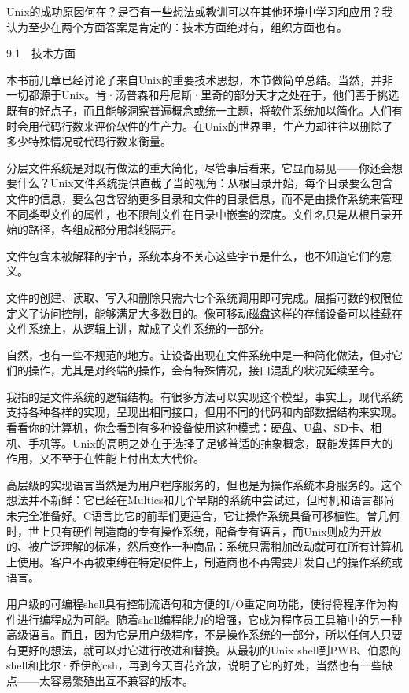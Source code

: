 \documentclass[a4paper,12pt,UTF8,twoside]{ctexbook}
\begin{document}
Unix的成功原因何在？是否有一些想法或教训可以在其他环境中学习和应用？我认为至少在两个方面答案是肯定的：技术方面绝对有，组织方面也有。





9.1　技术方面


本书前几章已经讨论了来自Unix的重要技术思想，本节做简单总结。当然，并非一切都源于Unix。肯·汤普森和丹尼斯·里奇的部分天才之处在于，他们善于挑选既有的好点子，而且能够洞察普遍概念或统一主题，将软件系统加以简化。人们有时会用代码行数来评价软件的生产力。在Unix的世界里，生产力却往往以删除了多少特殊情况或代码行数来衡量。

分层文件系统是对既有做法的重大简化，尽管事后看来，它显而易见——你还会想要什么？Unix文件系统提供直截了当的视角：从根目录开始，每个目录要么包含文件的信息，要么包含容纳更多目录和文件的目录信息，而不是由操作系统来管理不同类型文件的属性，也不限制文件在目录中嵌套的深度。文件名只是从根目录开始的路径，各组成部分用斜线隔开。

文件包含未被解释的字节，系统本身不关心这些字节是什么，也不知道它们的意义。

文件的创建、读取、写入和删除只需六七个系统调用即可完成。屈指可数的权限位定义了访问控制，能够满足大多数目的。像可移动磁盘这样的存储设备可以挂载在文件系统上，从逻辑上讲，就成了文件系统的一部分。

自然，也有一些不规范的地方。让设备出现在文件系统中是一种简化做法，但对它们的操作，尤其是对终端的操作，会有特殊情况，接口混乱的状况延续至今。

我指的是文件系统的逻辑结构。有很多方法可以实现这个模型，事实上，现代系统支持各种各样的实现，呈现出相同接口，但用不同的代码和内部数据结构来实现。看看你的计算机，你会看到有多种设备使用这种模式：硬盘、U盘、SD卡、相机、手机等。Unix的高明之处在于选择了足够普适的抽象概念，既能发挥巨大的作用，又不至于在性能上付出太大代价。

高层级的实现语言当然是为用户程序服务的，但也是为操作系统本身服务的。这个想法并不新鲜：它已经在Multics和几个早期的系统中尝试过，但时机和语言都尚未完全准备好。C语言比它的前辈们更适合，它让操作系统具备可移植性。曾几何时，世上只有硬件制造商的专有操作系统，配备专有语言，而Unix则成为开放的、被广泛理解的标准，然后变作一种商品：系统只需稍加改动就可在所有计算机上使用。客户不再被束缚在特定硬件上，制造商也不再需要开发自己的操作系统或语言。

用户级的可编程shell具有控制流语句和方便的I/O重定向功能，使得将程序作为构件进行编程成为可能。随着shell编程能力的增强，它成为程序员工具箱中的另一种高级语言。而且，因为它是用户级程序，不是操作系统的一部分，所以任何人只要有更好的想法，就可以对它进行改进和替换。从最初的Unix shell到PWB、伯恩的shell和比尔·乔伊的csh，再到今天百花齐放，说明了它的好处，当然也有一些缺点——太容易繁殖出互不兼容的版本。
\end{document}
